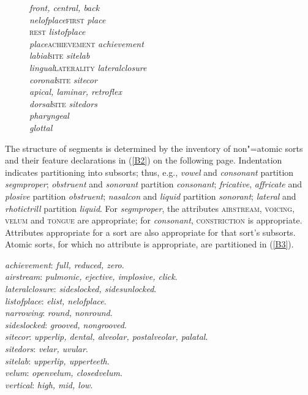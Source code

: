 \documentclass[output=paper]{langsci/langscibook}
\begin{document}
\begin{figure}
\begin{exe}
\begin{tabbing}
\>\textit{front, central, back} \\
\textit{nelofplace}\>\>\>\>\>\textsc{first} \textit{place} \\
\>\>\>\>\>\textsc{rest} \textit{listofplace} \\
\textit{place}\>\>\>\>\>\textsc{achievement} \textit{achievement} \\
\>\textit{labial}\>\>\>\>\textsc{site} \textit{sitelab} \\
\>\textit{lingual}\>\>\>\>\textsc{laterality} \textit{lateralclosure} \\
\>\>\textit{coronal}\>\>\>\textsc{site} \textit{sitecor} \\
\>\>\>\textit{apical, laminar, retroflex} \\
\>\>\textit{dorsal}\>\>\>\textsc{site} \textit{sitedors} \\
\>\textit{pharyngeal} \\
\>\textit{glottal}
\end{tabbing}
\end{exe}
\end{figure}

%
The structure of segments is determined by the inventory of non"=atomic
sorts and their feature declarations in (\ref{B2}) on the following page. Indentation indicates
partitioning into subsorts; thus, e.g., \textit{vowel}\/ and \textit{consonant}\/
partition \textit{segmproper}\/; \textit{obstruent}\/ and \textit{sonorant}\/
partition \textit{consonant}\/; \textit{fricative}, \textit{affricate}\/ and \textit{plosive}\/ partition \textit{obstruent}\/; \textit{nasalcon}\/ and \textit{liquid}\/ partition \textit{sonorant}\/; \textit{lateral}\/ and \textit{rhotictrill}\/ partition \textit{liquid}. For \textit{segmproper}, the
attributes \textsc{airstream}, \textsc{voicing}, \textsc{velum} and \textsc{tongue} are
appropriate; for \textit{consonant}, \textsc{constriction} is appropriate.
Attributes appropriate for a sort are also appropriate for that sort's
subsorts.  Atomic sorts, for which no attribute is appropriate, are
partitioned in (\ref{B3}).
\begin{exe}
\ex
\label{B3}
\textit{achievement}\/: \textit{full, reduced, zero}\/.\\
\textit{airstream}\/: \textit{pulmonic, ejective, implosive, click}\/.\\
\textit{lateralclosure}\/: \textit{sideslocked, sidesunlocked}\/.\\
\textit{listofplace}\/: \textit{elist, nelofplace}\/.\\
\textit{narrowing}\/: \textit{round, nonround}\/.\\
\textit{sideslocked}\/: \textit{grooved, nongrooved}\/.\\
\textit{sitecor}\/: \textit{upperlip, dental, alveolar, postalveolar, palatal}\/.\\
\textit{sitedors}\/: \textit{velar, uvular}\/.\\
\textit{sitelab}\/: \textit{upperlip, upperteeth}\/.\\
\textit{velum}\/: \textit{openvelum, closedvelum}\/.\\
\textit{vertical}\/: \textit{high, mid, low}\/.
\end{exe} 
\end{document}
